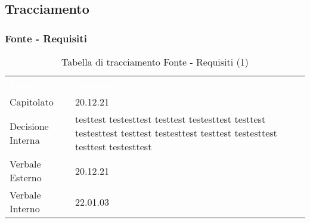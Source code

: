 \subsection{Tracciamento}

\subsubsection{Fonte - Requisiti}


\begin{table}[!htbp]
\renewcommand{\arraystretch}{1.5}
\begin{tabular}{ m{}<{\centering}  m{}<{\centering} }
	\rowcolor{darkblue}
	\textcolor{white}{\textbf{Fonte}} &\textcolor{white}{\textbf{Requisiti}}\\ 

	Capitolato & 20.12.21\\	

	Decisione Interna & testtest testesttest testtest testesttest testtest testesttest testtest testesttest testtest testesttest testtest testesttest\\
	
	Verbale Esterno & 20.12.21\\
	
	Verbale Interno & 22.01.03 \\

\end{tabular}
\caption{Tabella di tracciamento Fonte - Requisiti (1)}
\end{table}

